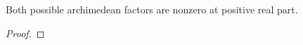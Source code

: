 \begin{theorem}
\label{gamma}
\leanok
Both possible archimedean factors are nonzero at positive real part.
\end{theorem}
\begin{proof}
\leanok
\end{proof}
